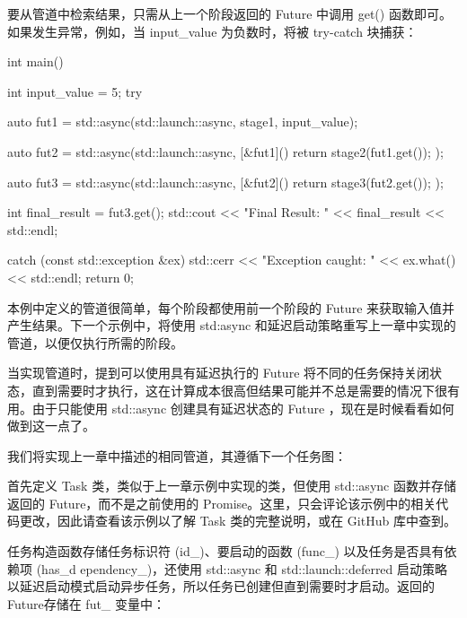 要从管道中检索结果，只需从上一个阶段返回的 Future 中调用 get() 函数即可。如果发生异常，例如，当 input\_value 为负数时，将被 try-catch 块捕获：

\begin{cpp}
int main() {
    int input_value = 5;
    try {
        auto fut1 = std::async(std::launch::async,
                          stage1, input_value);

        auto fut2 = std::async(std::launch::async,
                            [&fut1]() {
                                return stage2(fut1.get()); });

        auto fut3 = std::async(std::launch::async,
                            [&fut2]() {
                                return stage3(fut2.get()); });

        int final_result = fut3.get();
        std::cout << "Final Result: "
                  << final_result << std::endl;

    } catch (const std::exception &ex) {
        std::cerr << "Exception caught: "
                  << ex.what() << std::endl;
    }
    return 0;
}
\end{cpp}

本例中定义的管道很简单，每个阶段都使用前一个阶段的 Future 来获取输入值并产生结果。下一个示例中，将使用 std:async 和延迟启动策略重写上一章中实现的管道，以便仅执行所需的阶段。


当实现管道时，提到可以使用具有延迟执行的 Future 将不同的任务保持关闭状态，直到需要时才执行，这在计算成本很高但结果可能并不总是需要的情况下很有用。由于只能使用 std::async 创建具有延迟状态的 Future ，现在是时候看看如何做到这一点了。

我们将实现上一章中描述的相同管道，其遵循下一个任务图：


首先定义 Task 类，类似于上一章示例中实现的类，但使用 std::async 函数并存储返回的 Future，而不是之前使用的 Promise。这里，只会评论该示例中的相关代码更改，因此请查看该示例以了解 Task 类的完整说明，或在 GitHub 库中查到。

任务构造函数存储任务标识符 (id\_)、要启动的函数 (func\_) 以及任务是否具有依赖项 (has\_d ependency\_)，还使用 std::async 和 std::launch::deferred 启动策略以延迟启动模式启动异步任务，所以任务已创建但直到需要时才启动。返回的Future存储在 fut\_ 变量中：

